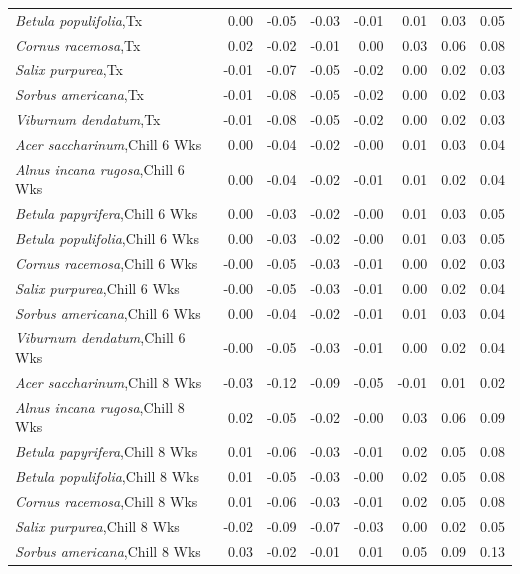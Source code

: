 \documentclass{article}\usepackage[]{graphicx}\usepackage[]{color}
\begin{document}
\begin{longtable}{lrrrrrrr}
  \textit{Betula populifolia},Tx & 0.00 & -0.05 & -0.03 & -0.01 & 0.01 & 0.03 & 0.05 \\ 
  \textit{Cornus racemosa},Tx & 0.02 & -0.02 & -0.01 & 0.00 & 0.03 & 0.06 & 0.08 \\ 
  \textit{Salix purpurea},Tx & -0.01 & -0.07 & -0.05 & -0.02 & 0.00 & 0.02 & 0.03 \\ 
  \textit{Sorbus americana},Tx & -0.01 & -0.08 & -0.05 & -0.02 & 0.00 & 0.02 & 0.03 \\ 
  \textit{Viburnum dendatum},Tx & -0.01 & -0.08 & -0.05 & -0.02 & 0.00 & 0.02 & 0.03 \\ 
  \textit{Acer saccharinum},Chill 6 Wks & 0.00 & -0.04 & -0.02 & -0.00 & 0.01 & 0.03 & 0.04 \\ 
  \textit{Alnus incana rugosa},Chill 6 Wks & 0.00 & -0.04 & -0.02 & -0.01 & 0.01 & 0.02 & 0.04 \\ 
  \textit{Betula papyrifera},Chill 6 Wks & 0.00 & -0.03 & -0.02 & -0.00 & 0.01 & 0.03 & 0.05 \\ 
  \textit{Betula populifolia},Chill 6 Wks & 0.00 & -0.03 & -0.02 & -0.00 & 0.01 & 0.03 & 0.05 \\ 
  \textit{Cornus racemosa},Chill 6 Wks & -0.00 & -0.05 & -0.03 & -0.01 & 0.00 & 0.02 & 0.03 \\ 
  \textit{Salix purpurea},Chill 6 Wks & -0.00 & -0.05 & -0.03 & -0.01 & 0.00 & 0.02 & 0.04 \\ 
  \textit{Sorbus americana},Chill 6 Wks & 0.00 & -0.04 & -0.02 & -0.01 & 0.01 & 0.03 & 0.04 \\ 
  \textit{Viburnum dendatum},Chill 6 Wks & -0.00 & -0.05 & -0.03 & -0.01 & 0.00 & 0.02 & 0.04 \\ 
  \textit{Acer saccharinum},Chill 8 Wks & -0.03 & -0.12 & -0.09 & -0.05 & -0.01 & 0.01 & 0.02 \\ 
  \textit{Alnus incana rugosa},Chill 8 Wks & 0.02 & -0.05 & -0.02 & -0.00 & 0.03 & 0.06 & 0.09 \\ 
  \textit{Betula papyrifera},Chill 8 Wks & 0.01 & -0.06 & -0.03 & -0.01 & 0.02 & 0.05 & 0.08 \\ 
  \textit{Betula populifolia},Chill 8 Wks & 0.01 & -0.05 & -0.03 & -0.00 & 0.02 & 0.05 & 0.08 \\ 
  \textit{Cornus racemosa},Chill 8 Wks & 0.01 & -0.06 & -0.03 & -0.01 & 0.02 & 0.05 & 0.08 \\ 
  \textit{Salix purpurea},Chill 8 Wks & -0.02 & -0.09 & -0.07 & -0.03 & 0.00 & 0.02 & 0.05 \\ 
  \textit{Sorbus americana},Chill 8 Wks & 0.03 & -0.02 & -0.01 & 0.01 & 0.05 & 0.09 & 0.13 \\ 

\end{longtable}
\end{document}
